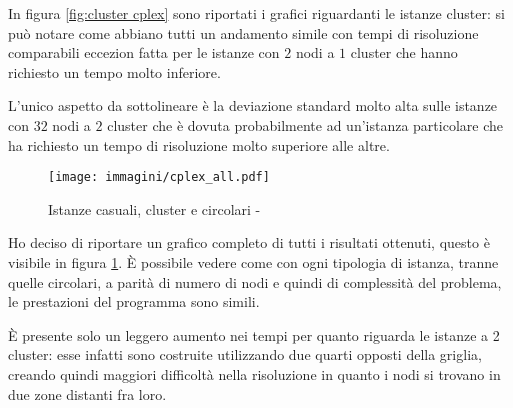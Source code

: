 In figura \ref{fig:cluster cplex} sono riportati i grafici riguardanti le istanze cluster: si può notare come abbiano tutti un andamento simile con tempi di risoluzione comparabili eccezion fatta per le istanze con $2$ nodi a $1$ cluster che hanno richiesto un tempo molto inferiore.

L'unico aspetto da sottolineare è la deviazione standard molto alta sulle istanze con $32$ nodi a $2$ cluster che è dovuta probabilmente ad un'istanza particolare che ha richiesto un tempo di risoluzione molto superiore alle altre.

\begin{figure}[htb]
	\centering
	\texttt{[image: immagini/cplex\_all.pdf]}
	\caption{Istanze casuali, cluster e circolari - }
	\label{fig:all cplex}
\end{figure}

Ho deciso di riportare un grafico completo di tutti i risultati ottenuti, questo è visibile in figura \ref{fig:all cplex}.
È possibile vedere come con ogni tipologia di istanza, tranne quelle circolari, a parità di numero di nodi e quindi di complessità del problema, le prestazioni del programma sono simili.

È presente solo un leggero aumento nei tempi per quanto riguarda le istanze a 2 cluster: esse infatti sono costruite utilizzando due quarti opposti della griglia, creando quindi maggiori difficoltà nella risoluzione in quanto i nodi si trovano in due zone distanti fra loro.

